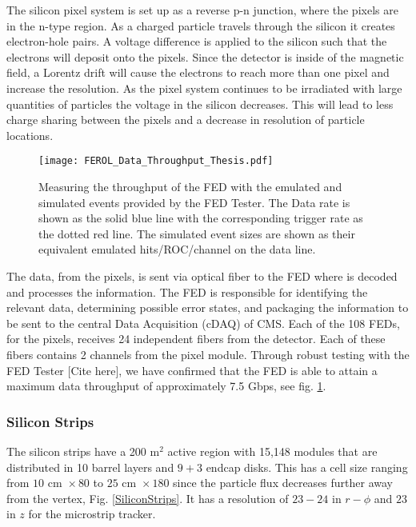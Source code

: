 The silicon pixel system is set up as a reverse p-n junction, where the pixels are in the n-type region. As a charged particle travels through the silicon it creates electron-hole pairs. A voltage difference is applied to the silicon such that the electrons will deposit onto the pixels. Since the detector is inside of the magnetic field, a Lorentz drift will cause the electrons to reach more than one pixel and increase the resolution. As the pixel system continues to be irradiated with large quantities of particles the voltage in the silicon decreases. This will lead to less charge sharing between the pixels and a decrease in resolution of particle locations. 

\begin{figure}
 	\centering
	\texttt{[image: FEROL\_Data\_Throughput\_Thesis.pdf]}
 	\caption[FED Throughput]{Measuring the throughput of the FED with the emulated and simulated events provided by the FED Tester. The Data rate is shown as the solid blue line with the corresponding trigger rate as the dotted red line. The simulated event sizes are shown as their equivalent emulated hits/ROC/channel on the data line.}
 	\label{FEDThroughput} 
\end{figure}

The data, from the pixels, is sent via optical fiber to the FED where is decoded and processes the information. The FED is responsible for identifying the relevant data, determining possible error states, and packaging the information to be sent to the central Data Acquisition (cDAQ) of CMS. Each of the 108 FEDs, for the pixels, receives 24 independent fibers from the detector. Each of these fibers contains 2 channels from the pixel module. Through robust testing with the FED Tester [Cite here], we have confirmed that the FED is able to attain a maximum data throughput of approximately 7.5 Gbps, see fig. \ref{FEDThroughput}. 

\subsubsection{Silicon Strips}
\label{subsec:Strips}

The silicon strips have a 200 m$^2$ active region with 15,148 modules that are distributed in 10 barrel layers and $9+3$ endcap disks.
This has a cell size ranging from $10 \text{ cm } \times80$ \mum{} to $25 \text{ cm } \times 180$ \mum{} since the particle flux decreases further away from the vertex, Fig. \ref{SiliconStrips}. It has a resolution of $23-24$ \mum{} in $r-\phi$ and $23$ \mum{} in $z$ for the microstrip tracker.

